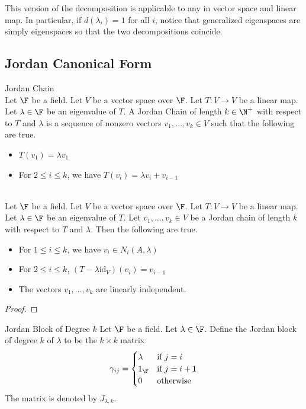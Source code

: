 \documentclass[a4paper]{article}
\begin{document}
This version of the decomposition is applicable to any in vector space and linear map. In particular, if $d(\lambda_i)=1$ for all $i$, notice that generalized eigenspaces are simply eigenspaces so that the two decompositions coincide. 

\subsection{Jordan Canonical Form}
\begin{defn}{Jordan Chain}{}\\
Let $\F$ be a field. Let $V$ be a vector space over $\F$. Let $T:V\to V$ be a linear map. Let $\lambda\in\F$ be an eigenvalue of $T$. A Jordan Chain of length $k\in\N^+$ with respect to $T$ and $\lambda$ is a sequence of nonzero vectors $v_1,\dots,v_k\in V$ such that the following are true. 
\begin{itemize}
\item $T(v_1)=\lambda v_1$
\item For $2\leq i\leq k$, we have $T(v_i)=\lambda v_i+v_{i-1}$
\end{itemize}
\end{defn}

\begin{lmm}{}{}\\
Let $\F$ be a field. Let $V$ be a vector space over $\F$. Let $T:V\to V$ be a linear map. Let $\lambda\in\F$ be an eigenvalue of $T$. Let $v_1,\dots,v_k\in V$ be a Jordan chain of length $k$ with respect to $T$ and $\lambda$. Then the following are true. 
\begin{itemize}
\item For $1\leq i\leq k$, we have $v_i\in N_i(A,\lambda)$
\item For $2\leq i\leq k$, $(T-\lambda\text{id}_V)(v_i)=v_{i-1}$
\item The vectors $v_1,\dots,v_k$ are linearly independent. 
\end{itemize} 
\begin{proof}
\end{proof}
\end{lmm}

\begin{defn}{Jordan Block of Degree $k$}{} Let $\F$ be a field. Let $\lambda\in\F$. Define the Jordan block of degree $k$ of $\lambda$ to be the $k\times k$ matrix $$
\gamma_{ij}=\begin{cases}
\lambda & \text{if $j=i$}\\
1_\F & \text{if $j=i+1$}\\
0 & \text{otherwise}
\end{cases}$$
The matrix is denoted by $J_{\lambda,k}$. 
\end{defn}
\end{document}

